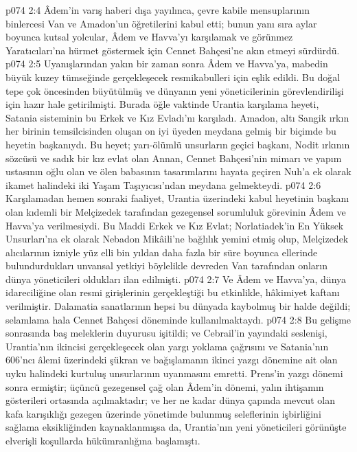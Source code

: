 \vs p074 2:4 Âdem’in varış haberi dışa yayılınca, çevre kabile mensuplarının binlercesi Van ve Amadon’un öğretilerini kabul etti; bunun yanı sıra aylar boyunca kutsal yolcular, Âdem ve Havva’yı karşılamak ve görünmez Yaratıcıları’na hürmet göstermek için Cennet Bahçesi’ne akın etmeyi sürdürdü.
\vs p074 2:5 Uyanışlarından yakın bir zaman sonra Âdem ve Havva’ya, mabedin büyük kuzey tümseğinde gerçekleşecek resmikabulleri için eşlik edildi. Bu doğal tepe çok öncesinden büyütülmüş ve dünyanın yeni yöneticilerinin görevlendirilişi için hazır hale getirilmişti. Burada öğle vaktinde Urantia karşılama heyeti, Satania sisteminin bu Erkek ve Kız Evladı’nı karşıladı. Amadon, altı Sangik ırkın her birinin temsilcisinden oluşan on iyi üyeden meydana gelmiş bir biçimde bu heyetin başkanıydı. Bu heyet; yarı\hyp{}ölümlü unsurların geçici başkanı, Nodit ırkının sözcüsü ve sadık bir kız evlat olan Annan, Cennet Bahçesi’nin mimarı ve yapım ustasının oğlu olan ve ölen babasının tasarımlarını hayata geçiren Nuh’a ek olarak ikamet halindeki iki Yaşam Taşıyıcısı’ndan meydana gelmekteydi.
\vs p074 2:6 Karşılamadan hemen sonraki faaliyet, Urantia üzerindeki kabul heyetinin başkanı olan kıdemli bir Melçizedek tarafından gezegensel sorumluluk görevinin Âdem ve Havva’ya verilmesiydi. Bu Maddi Erkek ve Kız Evlat; Norlatiadek’in En Yüksek Unsurları’na ek olarak Nebadon Mikâili’ne bağlılık yemini etmiş olup, Melçizedek alıcılarının izniyle yüz elli bin yıldan daha fazla bir süre boyunca ellerinde bulundurdukları unvansal yetkiyi böylelikle devreden Van tarafından onların dünya yöneticileri oldukları ilan edilmişti.
\vs p074 2:7 Ve Âdem ve Havva’ya, dünya idareciliğine olan resmi girişlerinin gerçekleştiği bu etkinlikle, hâkimiyet kaftanı verilmiştir. Dalamatia sanatlarının hepsi bu dünyada kaybolmuş bir halde değildi; selamlama hala Cennet Bahçesi döneminde kullanılmaktaydı.
\vs p074 2:8 Bu gelişme sonrasında baş meleklerin duyurusu işitildi; ve Cebrail’in yayındaki seslenişi, Urantia’nın ikincisi gerçekleşecek olan yargı yoklama çağrısını ve Satania’nın 606’ncı âlemi üzerindeki şükran ve bağışlamanın ikinci yazgı dönemine ait olan uyku halindeki kurtuluş unsurlarının uyanmasını emretti. Prens’in yazgı dönemi sonra ermiştir; üçüncü gezegensel çağ olan Âdem’in dönemi, yalın ihtişamın gösterileri ortasında açılmaktadır; ve her ne kadar dünya çapında mevcut olan kafa karışıklığı gezegen üzerinde yönetimde bulunmuş seleflerinin işbirliğini sağlama eksikliğinden kaynaklanmışsa da, Urantia’nın yeni yöneticileri görünüşte elverişli koşullarda hükümranlığına başlamıştı.

